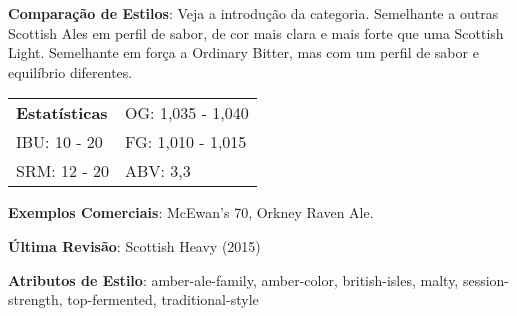 \textbf{Comparação de Estilos}: Veja a introdução da categoria. Semelhante a outras Scottish Ales em perfil de sabor, de cor mais clara e mais forte que uma Scottish Light. Semelhante em força a Ordinary Bitter, mas com um perfil de sabor e equilíbrio diferentes.

\begin{tabular}{@{}p{35mm}p{35mm}@{}}
  \textbf{Estatísticas} & OG: 1,035 - 1,040 \\
  IBU: 10 - 20 & FG: 1,010 - 1,015  \\
  SRM: 12 - 20  & ABV: 3,3%
\end{tabular}

\textbf{Exemplos Comerciais}: McEwan's 70, Orkney Raven Ale.

\textbf{Última Revisão}: Scottish Heavy (2015)

\textbf{Atributos de Estilo}: amber-ale-family, amber-color, british-isles, malty, session-strength, top-fermented, traditional-style
